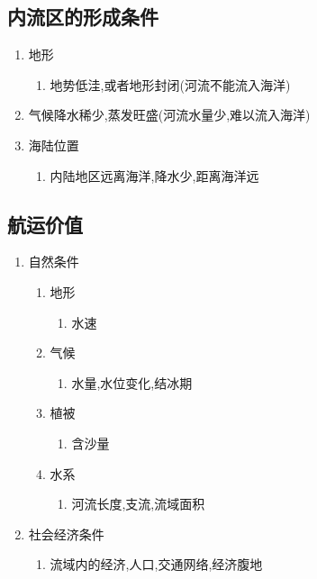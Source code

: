 \documentclass[a4paper]{article}
\begin{document}
    \subsection{内流区的形成条件}
    \begin{enumerate}
        \item 地形
            \begin{enumerate}
                \item 地势低洼,或者地形封闭(河流不能流入海洋)
            \end{enumerate}
        \item 气候降水稀少,蒸发旺盛(河流水量少,难以流入海洋)
        \item 海陆位置
            \begin{enumerate}
                \item 内陆地区远离海洋,降水少,距离海洋远
            \end{enumerate}
    \end{enumerate}
    \subsection{航运价值}
    \begin{enumerate}
        \item 自然条件
        \begin{enumerate}
            \item 地形
            \begin{enumerate}
                \item 水速
            \end{enumerate}
            \item 气候
            \begin{enumerate}
                \item 水量,水位变化,结冰期
            \end{enumerate}
            \item 植被
            \begin{enumerate}
                \item 含沙量
            \end{enumerate}
            \item 水系
            \begin{enumerate}
                \item 河流长度,支流,流域面积
            \end{enumerate}
        \end{enumerate}
        \item 社会经济条件
        \begin{enumerate}
            \item 流域内的经济,人口,交通网络,经济腹地
        \end{enumerate}
    \end{enumerate}
\end{document}
